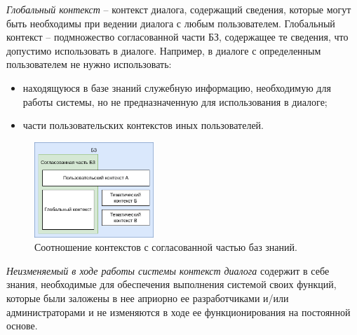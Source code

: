 \textit{Глобальный контекст} -- контекст диалога, содержащий сведения, которые могут быть необходимы при ведении диалога с любым пользователем. Глобальный контекст -- подмножество согласованной части БЗ, содержащее те сведения, что допустимо использовать в диалоге. Например, в диалоге с определенным пользователем не нужно использовать:
\begin{itemize}
    \item находящуюся в базе знаний служебную информацию, необходимую для работы системы, но не предназначенную для использования в диалоге;
    \item части пользовательских контекстов иных пользователей.
\end{itemize}

\begin{figure}[h]
    \centering
    \includegraphics[width=0.4\textwidth]{images/part4/chapter_nl_interfaces/context_in_KB.png}
    \caption{Соотношение контекстов с согласованной частью баз знаний.}
    \label{fig:context_in_KB}
\end{figure}

\begin{SCn}

    \begin{scnindent}
        \begin{scneqtoset}
        \end{scneqtoset}
    \end{scnindent}

\end{SCn}

\textit{Неизменяемый в ходе работы системы контекст диалога} содержит в себе знания, необходимые для обеспечения выполнения системой своих функций,  которые были заложены в нее априорно ее разработчиками и/или администраторами и не изменяются в ходе ее функционирования на постоянной основе.

